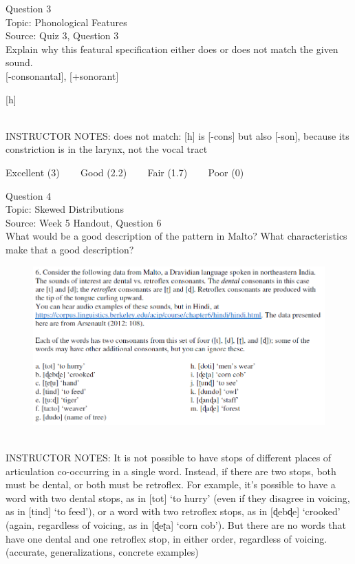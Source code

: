 \documentclass[12pt]{article}
\begin{document}
{\large Question 3}\\

Topic: Phonological Features\\
Source: Quiz 3, Question 3\\

Explain why this featural specification either does or does not match the given sound.\\

{[-consonantal]}, {[+sonorant]}

{[h]}


~\\
INSTRUCTOR NOTES: does not match: [h] is [-cons] but also [-son], because its constriction is in the larynx, not the vocal tract


\vfill
Excellent (3) ~~~ Good (2.2) ~~~ Fair (1.7) ~~~ Poor (0)
\newpage

{\large Question 4}\\

Topic: Skewed Distributions\\
Source: Week 5 Handout, Question 6\\

What would be a good description of the pattern in Malto? What characteristics make that a good description?\\

\begin{figure}[H]
\includegraphics{../images/malto.png}
\end{figure}

~\\
INSTRUCTOR NOTES: It is not possible to have stops of different places of articulation co-occurring in a single word. Instead, if there are two stops, both must be dental, or both must be retroflex. For example, it’s possible to have a word with two dental stops, as in [tot] ‘to hurry’ (even if they disagree in voicing, as in [tind] ‘to feed’), or a word with two retroflex stops, as in [ɖebɖe] ‘crooked’ (again, regardless of voicing, as in [ɖeʈa] ‘corn cob’). But there are no words that have one dental and one retroflex stop, in either order, regardless of voicing. (accurate, generalizations, concrete examples)
\end{document}
